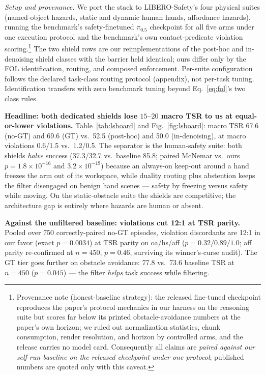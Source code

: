 \documentclass[conference]{IEEEtran}
\begin{document}
\emph{Setup and provenance.} We port the stack to LIBERO-Safety's four physical suites (named-object hazards, static and dynamic human hands, affordance hazards), running the benchmark's safety-finetuned $\pi_{0.5}$ checkpoint for all five arms under one execution protocol and the benchmark's own contact-predicate violation scoring.\footnote{Provenance note (honest-baseline strategy): the released fine-tuned checkpoint reproduces the paper's protocol mechanics in our harness on the reasoning suite but scores far below its printed obstacle-avoidance numbers at the paper's own horizon; we ruled out normalization statistics, chunk consumption, render resolution, and horizon by controlled arms, and the release carries no model card. Consequently all claims are \emph{paired against our self-run baseline on the released checkpoint under one protocol}; published numbers are quoted only with this caveat.} The two shield rows are our reimplementations of the post-hoc and in-denoising shield classes with the barrier held identical; ours differ only by the FOL identification, routing, and composed enforcement. Per-suite configuration follows the declared task-class routing protocol (appendix), not per-task tuning. Identification transfers with zero benchmark tuning beyond Eq.~\eqref{eq:fol}'s two class rules.

\textbf{Headline: both dedicated shields lose $15$--$20$ macro TSR to us at equal-or-lower violations.} Table~\ref{tab:lsboard} and Fig.~\ref{fig:lsboard}: macro TSR 67.6 (no-GT) and 69.6 (GT) vs.\ 52.5 (post-hoc) and 50.0 (in-denoising), at macro violations 0.6/1.5 vs.\ 1.2/0.5. The separator is the human-safety suite: both shields \emph{halve} success (37.3/32.7 vs.\ baseline 85.8; paired McNemar vs.\ ours $p=1.8\times10^{-16}$ and $3.2\times10^{-19}$) because an always-on keep-out around a hand freezes the arm out of its workspace, while duality routing plus abstention keeps the filter disengaged on benign hand scenes --- safety by freezing versus safety while moving. On the static-obstacle suite the shields are competitive; the architecture gap is entirely where hazards are human or absent.

\textbf{Against the unfiltered baseline: violations cut 12:1 at TSR parity.} Pooled over 750 correctly-paired no-GT episodes, violation discordants are 12:1 in our favor (exact $p=0.0034$) at TSR parity on oa/hs/aff ($p=0.32/0.89/1.0$; aff parity re-confirmed at $n{=}450$, $p=0.46$, surviving its winner's-curse audit). The GT tier goes further on obstacle avoidance: 77.8 vs.\ 73.6 baseline TSR at $n{=}450$ ($p=0.045$) --- the filter \emph{helps} task success while filtering.
\end{document}
